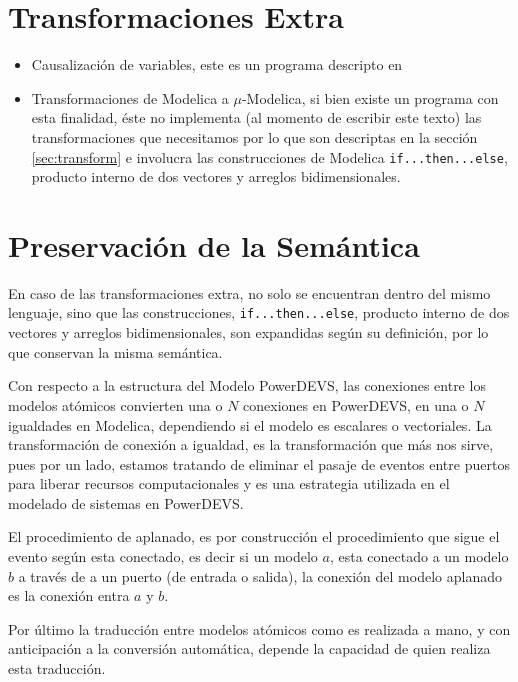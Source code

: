 \documentclass{beamer}
\begin{document}
\section{Transformaciones Extra}
\begin{frame}
	\begin{itemize}
	\item Causalización de variables, este es un programa descripto en \cite{Mod15}
	\item Transformaciones de Modelica a $\mu$-Modelica, si bien existe un programa con esta finalidad, éste no implementa (al momento de escribir este texto)
	las transformaciones que necesitamos por lo que son descriptas en la sección \ref{sec:transform} e involucra las construcciones de Modelica 
		\texttt{if...then...else}, producto interno de dos vectores y arreglos bidimensionales.
	\end{itemize}
\end{frame}

\section{Preservación de la Semántica}
\begin{frame}
	En caso de las transformaciones extra, no solo se encuentran dentro del mismo lenguaje, sino que las construcciones, \texttt{if...then...else}, 
		producto interno de dos vectores y arreglos bidimensionales, son expandidas según su definición, por lo que conservan la misma semántica.

	Con respecto a la estructura del Modelo PowerDEVS, las conexiones entre los modelos atómicos convierten una o $N$ conexiones en PowerDEVS, en una o $N$
	 igualdades en Modelica, dependiendo si el modelo es escalares o vectoriales. La transformación de conexión a igualdad, es la transformación que más 
	nos sirve, pues por un lado, estamos tratando de eliminar el pasaje de eventos entre puertos para liberar recursos computacionales y
	es una estrategia utilizada en el modelado de sistemas en PowerDEVS.

	El procedimiento de aplanado, es por construcción el procedimiento que sigue el evento según esta conectado, es decir si un modelo $a$, esta conectado
	a un modelo $b$ a través de a un puerto (de entrada o salida), la conexión del modelo aplanado es la conexión entra $a$ y $b$. 

	Por último la traducción entre modelos atómicos como es realizada a mano, y con anticipación a la conversión automática, depende la capacidad de 
	quien realiza esta traducción.
\end{frame}
\end{document}
